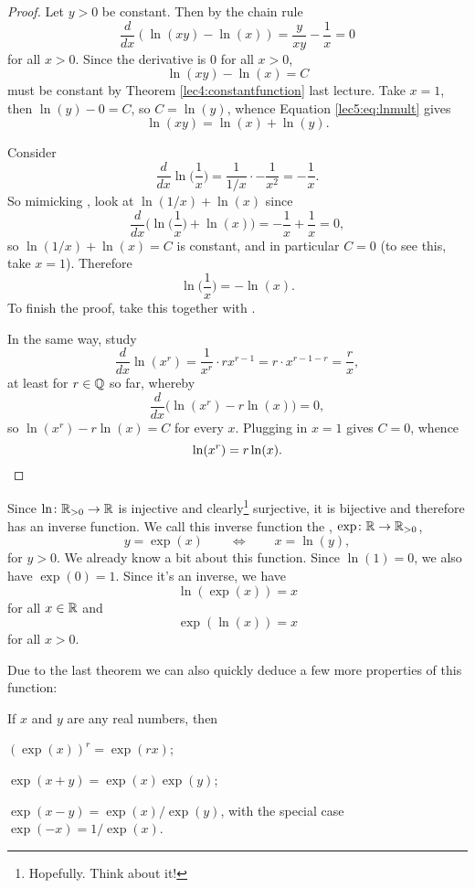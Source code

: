 \begin{proof}
	 Let $y > 0$ be constant.
	Then by the chain rule
	\[
		\frac{d}{d x} (\ln(x y) - \ln(x)) = \frac{y}{x y} - \frac{1}{x} = 0
	\]
	for all $x > 0$.
	Since the derivative is $0$ for all $x > 0$,
	\begin{equation}\label{lec5:eq:lnmult}
		\ln(x y) - \ln(x) = C
	\end{equation}
	must be constant by Theorem \ref{lec4:constantfunction} last lecture.
	Take $x = 1$, then $\ln(y) - 0 = C$, so $C = \ln(y)$, whence Equation \eqref{lec5:eq:lnmult} gives
	\[
		\ln(x y) = \ln(x) + \ln(y).
	\]

	 Consider
	\[
		\frac{d}{d x} \ln \Big ( \frac{1}{x} \Big ) = \frac{1}{1 / x} \cdot - \frac{1}{x^2} = - \frac{1}{x}.
	\]
	So mimicking , look at $\ln(1 / x) + \ln(x)$ since
	\[
		\frac{d}{d x} \Big ( \ln \big ( \frac{1}{x} \big ) + \ln(x) \Big ) = - \frac{1}{x} + \frac{1}{x} = 0,
	\]
	so $\ln(1 / x) + \ln(x) = C$ is constant, and in particular $C = 0$ (to see this, take $x = 1$).
	Therefore
	\[
		\ln \Big ( \frac{1}{x} \Big ) = - \ln(x).
	\]
	To finish the proof, take this together with .

	 In the same way, study
	\[
		\frac{d}{d x} \ln(x^r) = \frac{1}{x^r} \cdot r x^{r - 1} = r \cdot x^{r - 1 - r} = \frac{r}{x},
	\]
	at least for $r \in \mathbb{Q}$ so far, whereby
	\[
		\frac{d}{d x} \big ( \ln(x^r) - r \ln(x) \big ) = 0,
	\]
	so $\ln(x^r) - r \ln(x) = C$ for every $x$.
	Plugging in $x = 1$ gives $C = 0$, whence
	\[
		\ln(x^r) = r \ln(x). \qedhere
	\]
\end{proof}


Since $\ln \colon \mathbb{R}_{> 0} \to \mathbb{R}$ is injective and clearly\footnote{Hopefully. Think about it!} surjective, it is bijective and therefore has an inverse function.
We call this inverse function the , $\exp \colon \mathbb{R} \to \mathbb{R}_{> 0}$,
\[
	y = \exp(x) \qquad \Longleftrightarrow \qquad x = \ln(y),
\]
for $y > 0$.
We already know a bit about this function.
Since $\ln(1) = 0$, we also have $\exp(0) = 1$.
Since it's an inverse, we have
\[
	\ln(\exp(x)) = x
\]
for all $x \in \mathbb{R}$ and
\[
	\exp(\ln(x)) = x
\]
for all $x > 0$.

Due to the last theorem we can also quickly deduce a few more properties of this function:

\begin{theorem}
	If $x$ and $y$ are any real numbers, then
	\begin{romanlist}
		\item $(\exp(x))^r = \exp(r x)$;
		\item $\exp(x + y) = \exp(x) \exp(y)$;
		\item $\exp(x - y) = \exp(x) / \exp(y)$, with the special case $\exp(-x) = 1 / \exp(x)$.
	\end{romanlist}
\end{theorem}

